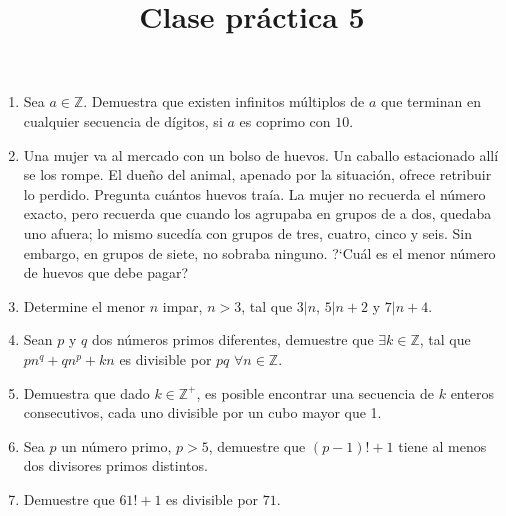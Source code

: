 \documentclass{article}
\title{Clase pr\'actica 5}
\begin{document}
\maketitle
\begin{enumerate}
    \item Sea $a \in \mathbb{Z}$. Demuestra que existen infinitos m\'ultiplos de $a$ que terminan en cualquier secuencia de d\'igitos, si $a$ es coprimo con $10$.
    \item Una mujer va al mercado con un bolso de huevos. Un caballo estacionado all\'i se los rompe. El due\~no del animal, apenado por la situaci\'on, ofrece retribuir lo perdido. Pregunta cu\'antos huevos tra\'ia. La mujer no recuerda el n\'umero exacto, pero recuerda que cuando los agrupaba en grupos de a dos, quedaba uno afuera; lo mismo suced\'ia con grupos de tres, cuatro, cinco y seis. Sin embargo, en grupos de siete, no sobraba ninguno. ?`Cu\'al es el menor n\'umero de huevos que debe pagar?
    \item Determine el menor $n$ impar, $n > 3$, tal que $3|n$, $5|n+2$ y $7|n+4$.
    \item Sean $p$ y $q$ dos n\'umeros primos diferentes, demuestre que $\exists k \in \mathbb{Z}$, tal que $pn^{q} + qn^{p} + kn$ es divisible por $pq$ $\forall n \in \mathbb{Z}$.
    \item Demuestra que dado $k \in \mathbb{Z}^{+}$, es posible encontrar una secuencia de $k$ enteros consecutivos, cada uno divisible por un cubo mayor que 1.
    \item Sea $p$ un n\'umero primo, $p > 5$, demuestre que $(p-1)! + 1$ tiene al menos dos divisores primos distintos.
    \item Demuestre que $61! + 1$ es divisible por $71$.
\end{enumerate}
\end{document}
